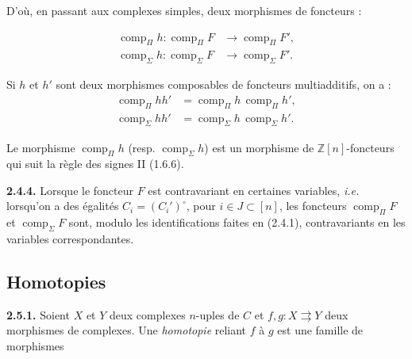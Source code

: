 %
D'où, en passant aux complexes simples, deux morphismes de foncteurs :

\begin{equation}
  \begin{aligned}
    \operatorname{comp}_{\Pi}h\colon
      \operatorname{comp}_{\Pi}F
      &\longrightarrow \operatorname{comp}_{\Pi}F',\\
    \operatorname{comp}_{\Sigma}h\colon
      \operatorname{comp}_{\Sigma}F
      &\longrightarrow \operatorname{comp}_{\Sigma}F'.
  \end{aligned}
  \tag{2.4.3.2}
\end{equation}

Si $h$ et $h'$ sont deux morphismes composables de foncteurs multiadditifs,
on a :
\begin{equation*}
  \begin{aligned}
    \operatorname{comp}_{\Pi}hh'
      &=\operatorname{comp}_{\Pi}h\,\operatorname{comp}_{\Pi}h',\\
    \operatorname{comp}_{\Sigma}hh'
      &=\operatorname{comp}_{\Sigma}h\,\operatorname{comp}_{\Sigma}h'.
  \end{aligned}
\end{equation*}

Le morphisme $\operatorname{comp}_{\Pi}h$ (resp.
$\operatorname{comp}_{\Sigma}h$) est un morphisme de
$\mathbb Z[n]$-foncteurs qui suit la règle des signes II (1.6.6).

\noindent\textbf{2.4.4.}\quad
Lorsque le foncteur $F$ est contravariant en certaines variables,
\emph{i.e.} lorsqu'on a des égalités
$C_i=(C_i')^\circ$, pour $i\in J\subset[n]$, les foncteurs
$\operatorname{comp}_{\Pi}F$ et $\operatorname{comp}_{\Sigma}F$ sont,
modulo les identifications faites en (2.4.1), contravariants en les variables
correspondantes.

\subsection{Homotopies}

\noindent\textbf{2.5.1.}\quad
Soient $X$ et $Y$ deux complexes $n$-uples de $C$ et
$f,g\colon X\rightrightarrows Y$ deux morphismes de complexes. Une
\emph{homotopie} reliant $f$ à $g$ est une famille de morphismes

